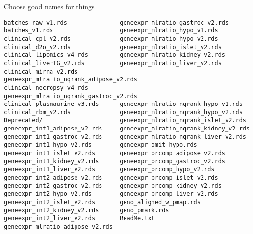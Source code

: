 \documentclass[aspectratio=169,12pt,t]{beamer}
\begin{document}
\begin{frame}[fragile,c]{Choose good names for things}


\begin{center}
\begin{minipage}[c]{9.5cm}
\begin{semiverbatim}
\lstset{basicstyle=\tiny}
\begin{lstlisting}[escapechar=!,linewidth=9.5cm]
batches_raw_v1.rds               geneexpr_mlratio_gastroc_v2.rds
batches_v1.rds                   geneexpr_mlratio_hypo_v1.rds
clinical_cpl_v2.rds              geneexpr_mlratio_hypo_v2.rds
clinical_d2o_v2.rds              geneexpr_mlratio_islet_v2.rds
clinical_lipomics_v4.rds         geneexpr_mlratio_kidney_v2.rds
clinical_liverTG_v2.rds          geneexpr_mlratio_liver_v2.rds
clinical_mirna_v2.rds            geneexpr_mlratio_nqrank_adipose_v2.rds
clinical_necropsy_v4.rds         geneexpr_mlratio_nqrank_gastroc_v2.rds
clinical_plasmaurine_v3.rds      geneexpr_mlratio_nqrank_hypo_v1.rds
clinical_rbm_v2.rds              geneexpr_mlratio_nqrank_hypo_v2.rds
Deprecated/                      geneexpr_mlratio_nqrank_islet_v2.rds
geneexpr_int1_adipose_v2.rds     geneexpr_mlratio_nqrank_kidney_v2.rds
geneexpr_int1_gastroc_v2.rds     geneexpr_mlratio_nqrank_liver_v2.rds
geneexpr_int1_hypo_v2.rds        geneexpr_omit_hypo.rds
geneexpr_int1_islet_v2.rds       geneexpr_prcomp_adipose_v2.rds
geneexpr_int1_kidney_v2.rds      geneexpr_prcomp_gastroc_v2.rds
geneexpr_int1_liver_v2.rds       geneexpr_prcomp_hypo_v2.rds
geneexpr_int2_adipose_v2.rds     geneexpr_prcomp_islet_v2.rds
geneexpr_int2_gastroc_v2.rds     geneexpr_prcomp_kidney_v2.rds
geneexpr_int2_hypo_v2.rds        geneexpr_prcomp_liver_v2.rds
geneexpr_int2_islet_v2.rds       geno_aligned_w_pmap.rds
geneexpr_int2_kidney_v2.rds      geno_pmark.rds
geneexpr_int2_liver_v2.rds       ReadMe.txt
geneexpr_mlratio_adipose_v2.rds
\end{lstlisting}
\end{semiverbatim}
\end{minipage}
\end{center}


\end{frame}
\end{document}
